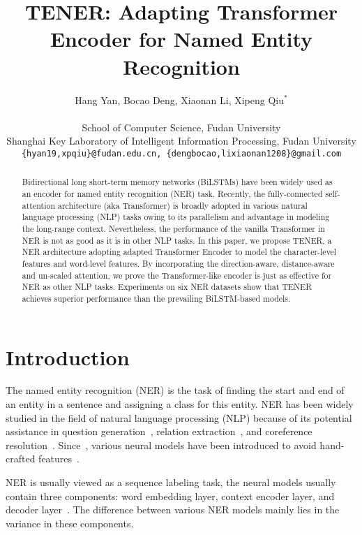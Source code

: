 \documentclass[11pt,a4paper]{article}
\title{TENER: Adapting Transformer Encoder for Named Entity Recognition}
\author{Hang Yan, Bocao Deng, Xiaonan Li, Xipeng Qiu$^*$ \\\\
	School of Computer Science, Fudan University\\ Shanghai Key Laboratory of Intelligent Information Processing, Fudan University \\
	{\small \texttt{\{hyan19,xpqiu\}@fudan.edu.cn, \{dengbocao,lixiaonan1208\}@gmail.com} }
}
\date{}
\begin{document}
\maketitle

\renewcommand{\thefootnote}{\fnsymbol{footnote}}
\renewcommand{\thefootnote}{\arabic{footnote}}

\begin{abstract}
 Bidirectional long short-term memory networks (BiLSTMs) have been widely used as an encoder for named entity recognition (NER) task.  Recently, the fully-connected self-attention architecture (aka Transformer) is broadly adopted in various natural language processing (NLP) tasks owing to its parallelism and advantage in modeling the long-range context. Nevertheless, the performance of the vanilla Transformer in NER is not as good as it is in other NLP tasks. In this paper, we propose TENER, a NER architecture adopting adapted Transformer Encoder to model the character-level features and word-level features. By incorporating the direction-aware, distance-aware and un-scaled attention, we prove the Transformer-like encoder is just as effective for NER as other NLP tasks.
Experiments on six NER datasets show that TENER achieves superior performance than the prevailing BiLSTM-based models.
\end{abstract}

\section{Introduction}

The named entity recognition (NER) is the task of finding the start and end of an entity in a sentence and assigning a class for this entity. NER has been widely studied in the field of natural language processing (NLP) because of its potential assistance in question generation~\cite{DBLP:conf/nlpcc/ZhouYWTBZ17}, relation extraction~\cite{miwa2016end}, and coreference resolution~\cite{fragkou2017applying}. Since~\cite{collobert2011natural}, various neural models have been introduced to avoid hand-crafted features~\cite{huang2015bidirectional,ma2016end,lample2016neural}.

NER is usually viewed as a sequence labeling task, the neural models usually contain three components: word embedding layer, context encoder layer, and decoder layer~\cite{huang2015bidirectional,ma2016end,lample2016neural,DBLP:journals/tacl/ChiuN16,chen2019grn,DBLP:conf/acl/ZhangLS18,gui2019lexicon}. The difference between various NER models mainly lies in the variance in these components.
\end{document}
